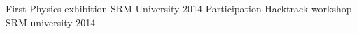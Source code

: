 \begin{cvhonors}
  \cvhonor
    {First}
    {Physics exhibition }
    {SRM University}
    {2014}
  \cvhonor
    {Participation}
    {Hacktrack workshop}
    {SRM university}
    {2014}
  \cvhonor
  \cvhonor
\end{cvhonors}

\begin{cvhonors}
  \cvhonor
  \cvhonor
\end{cvhonors}
